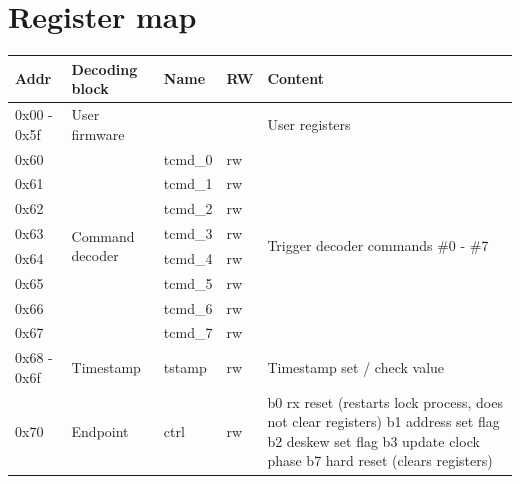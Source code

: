 \documentclass{article}
\begin{document}
\section{Register map}

\begin{table}[h!]
\begin{tabularx}{\textwidth}{|
p{}|
p{}|
p{}|
p{}|
p{}|} \hline
\textbf{Addr} & \textbf{Decoding block} & \textbf{Name} & \textbf{RW} & \textbf{Content} \\\hline 
0x00 - 0x5f   & User firmware           &               &               & User registers \\\hline 
0x60          & \multirow{8}{=}{Command decoder}  & tcmd\_0 & rw & \multirow{8}{=}{Trigger decoder commands \#0 - \#7}  \\\cline{1-1}\cline{3-4}
0x61          &                         & tcmd\_1 & rw &  \\\cline{1-1}\cline{3-4}
0x62          &                         & tcmd\_2 & rw &  \\\cline{1-1}\cline{3-4}
0x63          &                         & tcmd\_3 & rw &  \\\cline{1-1}\cline{3-4}
0x64          &                         & tcmd\_4 & rw &  \\\cline{1-1}\cline{3-4}
0x65          &                         & tcmd\_5 & rw &  \\\cline{1-1}\cline{3-4}
0x66          &                         & tcmd\_6 & rw &  \\\cline{1-1}\cline{3-4}
0x67          &                         & tcmd\_7 & rw &  \\\hline 
0x68 - 0x6f   & Timestamp               & tstamp & rw & Timestamp set / check value \\\hline 
0x70          & \multirow{6}{=}{Endpoint}  & ctrl & rw & b0 rx reset (restarts lock process, does not clear registers) \newline b1 address set flag \newline b2 deskew set flag \newline b3 update clock phase \newline b7 hard reset (clears registers) \\\cline{1-1}\cline{3-5}

\end{tabularx}
\end{table}
\end{document}
